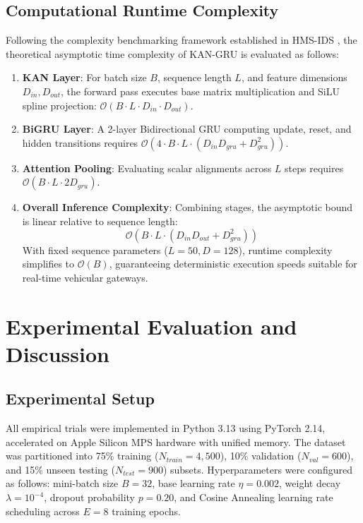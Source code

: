 \documentclass[conference]{IEEEtran}
\begin{document}
\subsection{Computational Runtime Complexity}
Following the complexity benchmarking framework established in HMS-IDS \cite{saurabh2024hmsids}, the theoretical asymptotic time complexity of KAN-GRU is evaluated as follows:
\begin{enumerate}
    \item \textbf{KAN Layer}: For batch size $B$, sequence length $L$, and feature dimensions $D_{in}, D_{out}$, the forward pass executes base matrix multiplication and SiLU spline projection: $\mathcal{O}(B \cdot L \cdot D_{in} \cdot D_{out})$.
    \item \textbf{BiGRU Layer}: A 2-layer Bidirectional GRU computing update, reset, and hidden transitions requires $\mathcal{O}(4 \cdot B \cdot L \cdot (D_{in} D_{gru} + D_{gru}^2))$.
    \item \textbf{Attention Pooling}: Evaluating scalar alignments across $L$ steps requires $\mathcal{O}(B \cdot L \cdot 2 D_{gru})$.
    \item \textbf{Overall Inference Complexity}: Combining stages, the asymptotic bound is linear relative to sequence length:
    \begin{equation}
        \mathcal{O}\left(B \cdot L \cdot (D_{in} D_{out} + D_{gru}^2)\right)
    \end{equation}
    With fixed sequence parameters ($L=50, D=128$), runtime complexity simplifies to $\mathcal{O}(B)$, guaranteeing deterministic execution speeds suitable for real-time vehicular gateways.
\end{enumerate}

\section{Experimental Evaluation and Discussion}

\subsection{Experimental Setup}
All empirical trials were implemented in Python 3.13 using PyTorch 2.14, accelerated on Apple Silicon MPS hardware with unified memory. The dataset was partitioned into 75\% training ($N_{train} = 4,500$), 10\% validation ($N_{val} = 600$), and 15\% unseen testing ($N_{test} = 900$) subsets. Hyperparameters were configured as follows: mini-batch size $B = 32$, base learning rate $\eta = 0.002$, weight decay $\lambda = 10^{-4}$, dropout probability $p = 0.20$, and Cosine Annealing learning rate scheduling across $E = 8$ training epochs.
\end{document}
